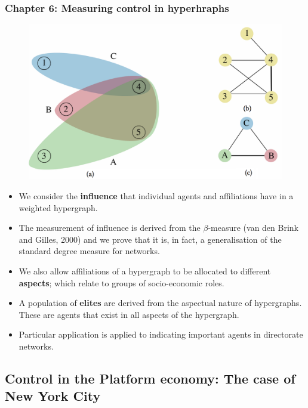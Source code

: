 \documentclass[10pt]{beamer}
\begin{document}
\begin{frame} \frametitle{Chapter 6: Measuring control in hyperhraphs}
\begin{figure}[h]
\centering
\includegraphics[scale=0.14]{../Images/hypergraph.png}
\end{figure}
\begin{itemize}
\medskip
\item We consider the \textbf{influence} that individual agents and affiliations have in a weighted hypergraph.
\end{itemize}
\end{frame}

\begin{frame}
\begin{itemize}
\item The measurement of influence is derived from the $\beta$-measure (van den Brink and Gilles, 2000) and we prove that it is, in fact, a generalisation of the standard degree measure for networks.
\medskip
\item We also allow affiliations of a hypergraph to be allocated to different \textbf{aspects}; which relate to groups of socio-economic roles.
\medskip
\item A population of \textbf{elites} are derived from the aspectual nature of hypergraphs. These are agents that exist in all aspects of the hypergraph.
\medskip
\item Particular application is applied to indicating important agents in directorate networks.
\end{itemize}
\end{frame}

\subsection{Control in the Platform economy: The case of New York City}
\end{document}
